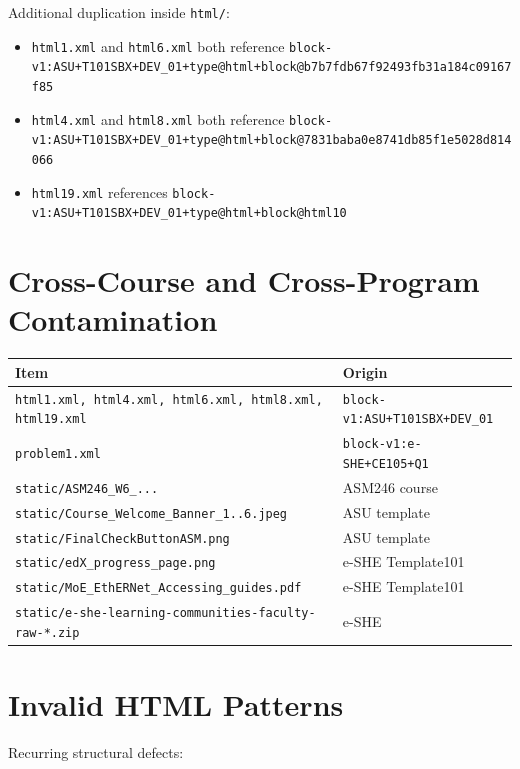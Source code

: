 Additional duplication inside \texttt{html/}:

\begin{itemize}
  \item \texttt{html1.xml} and \texttt{html6.xml} both reference
        \texttt{block-v1:ASU+T101SBX+DEV\_01+type@html+block@b7b7fdb67f92493fb31a184c09167f85}
  \item \texttt{html4.xml} and \texttt{html8.xml} both reference
        \texttt{block-v1:ASU+T101SBX+DEV\_01+type@html+block@7831baba0e8741db85f1e5028d814066}
  \item \texttt{html19.xml} references
        \texttt{block-v1:ASU+T101SBX+DEV\_01+type@html+block@html10}
\end{itemize}

\section{Cross-Course and Cross-Program Contamination}

\begin{table}[h]
\centering
\small
\begin{tabular}{@{}p{}p{}@{}}
\toprule
\textbf{Item} & \textbf{Origin} \\
\midrule
\texttt{html1.xml, html4.xml, html6.xml, html8.xml, html19.xml} & \texttt{block-v1:ASU+T101SBX+DEV\_01} \\
\texttt{problem1.xml} & \texttt{block-v1:e-SHE+CE105+Q1} \\
\texttt{static/ASM246\_W6\_...} & ASM246 course \\
\texttt{static/Course\_Welcome\_Banner\_1..6.jpeg} & ASU template \\
\texttt{static/FinalCheckButtonASM.png} & ASU template \\
\texttt{static/edX\_progress\_page.png} & e-SHE Template101 \\
\texttt{static/MoE\_EthERNet\_Accessing\_guides.pdf} & e-SHE Template101 \\
\texttt{static/e-she-learning-communities-faculty-raw-*.zip} & e-SHE \\
\bottomrule
\end{tabular}
\end{table}

\section{Invalid HTML Patterns}

Recurring structural defects:

